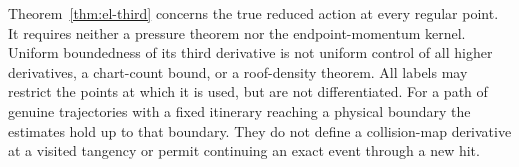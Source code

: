 \begin{remark}
\label{rem:el-domain}
Theorem~\ref{thm:el-third} concerns the true reduced action at every
regular point. It requires neither a pressure theorem nor the
endpoint-momentum kernel. Uniform boundedness of its third derivative
is not uniform control of all higher derivatives, a chart-count bound,
or a roof-density theorem. All labels may restrict the points at which
it is used, but are not differentiated. For a path of genuine trajectories
with a fixed itinerary reaching a physical boundary the estimates hold
up to that boundary. They do not define a collision-map derivative at a
visited tangency or permit continuing an exact event through a new hit.
\end{remark}
